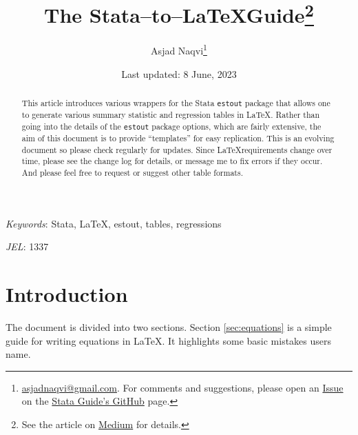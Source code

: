 \documentclass[11pt]{article}
\title{The Stata--to--\LaTeX Guide\thanks{See the article on \href{https://medium.com/the-stata-guide/the-stata-to-latex-guide-6e7ed5622856}{Medium} for details.}}
\author{
    Asjad Naqvi\thanks{\href{mailto:asjadnaqvi@gmail.com}{asjadnaqvi@gmail.com}. For comments and suggestions, please open an \href{https://github.com/asjadnaqvi/The-Stata-Guide/issues}{Issue} on the \href{https://github.com/asjadnaqvi/The-Stata-Guide}{Stata Guide's GitHub} page. }
    }
\date{Last updated: 8 June, 2023}
\numberwithin{table}{section}   %
\begin{document}
\maketitle

\begin{abstract}
This article introduces various wrappers for the Stata \texttt{estout} package \citep{Jann2005,Jann2007} that allows one to generate various summary statistic and regression tables in \LaTeX. Rather than going into the details of the \texttt{estout} package options, which are fairly extensive, the aim of this document is to provide ``templates'' for easy  replication. This is an evolving document so please check regularly for updates. Since \LaTeX requirements change over time, please see the change log for details, or message me to fix errors if they occur. And please feel free to request or suggest other table formats. 
\end{abstract}

\vspace{4ex}
\small{\textit{Keywords}: Stata, \LaTeX, estout, tables, regressions}

\small{\textit{JEL}: 1337}


\newpage


\tableofcontents

\listoftables

\newpage
\section*{Introduction}
The document is divided into two sections. 
Section \ref{sec:equations} is a simple guide for writing equations in \LaTeX. It highlights some basic mistakes users name.

\vspace{5pt}



\clearpage



\clearpage
\end{document}
